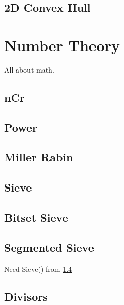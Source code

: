 \documentclass[10pt, a4paper]{article}
\begin{document}
\begin{multicols}{2}
\subsection{2D Convex Hull}


\section{Number Theory}
All about math.

\subsection{nCr}


\subsection{Power} \label{power}


\subsection{Miller Rabin}


\subsection{Sieve} \label{sieve}


\subsection{Bitset Sieve}


\subsection{Segmented Sieve}
Need Sieve() from \ref{sieve}


\subsection{Divisors}



\end{multicols}
\end{document}
